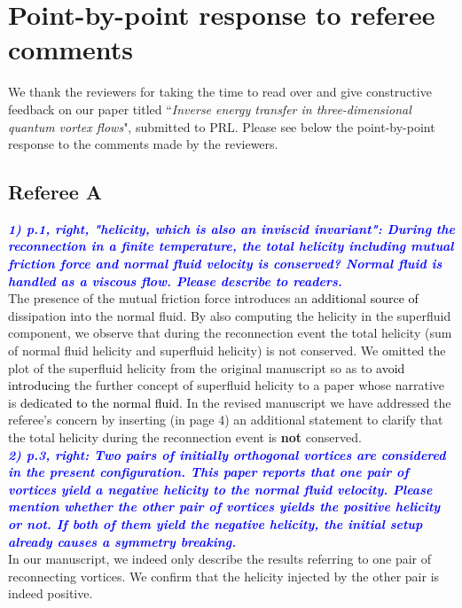 \documentclass[a4paper,10pt]{article}
\def\red#1{\textcolor{black}{#1}}
\def\blue#1{\textcolor{blue}{#1}}
\def\refcomment#1{\textbf{\blue{\emph{#1}}}\\}
\begin{document}
\section*{\centering Point-by-point response to referee comments}

We thank the reviewers for taking the time to read over and give constructive feedback on our paper titled “\emph{Inverse energy transfer in three-dimensional quantum vortex flows}", submitted to PRL. Please see below the point-by-point response to the comments made by the reviewers.

\subsection*{Referee A}


    \refcomment{1) p.1, right, "helicity, which is also an inviscid invariant": During
    the reconnection in a finite temperature, the total helicity including
    mutual friction force and normal fluid velocity is conserved? Normal
    fluid is handled as a viscous flow. Please describe to readers.}

    The presence of the mutual friction force introduces an \red{additional source of} dissipation into the normal fluid. By also computing the helicity in the superfluid component, we observe that during the reconnection event
the total helicity (sum of normal fluid helicity and superfluid helicity) is not conserved. We omitted the plot of the superfluid helicity
from the original manuscript so as to \red{avoid introducing}
the further concept 
of superfluid helicity to a paper whose narrative is \red{dedicated to the
normal fluid}. In the revised manuscript we have addressed the 
referee's concern by inserting (in page 4) an additional statement 
to clarify that the total helicity during the reconnection event is 
\textbf{not} conserved. \\

    \refcomment{2) p.3, right: Two pairs of initially orthogonal vortices are
    considered in the present configuration. This paper reports that one
    pair of vortices yield a negative helicity to the normal fluid
    velocity. Please mention whether the other pair of vortices yields the
    positive helicity or not. If both of them yield the negative helicity,
    the initial setup already causes a symmetry breaking.}

    In our manuscript, we indeed only describe the results referring to one pair of reconnecting 
    vortices. We confirm that the helicity injected by the other pair is indeed positive. 
    
\end{document}

